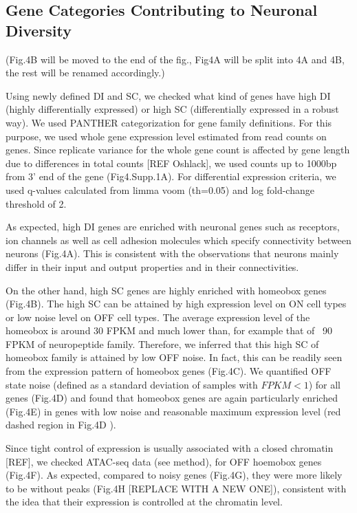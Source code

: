 \subsection{Gene Categories Contributing to Neuronal Diversity}

(Fig.4B will be moved to the end of the fig., Fig4A will be split into 4A and 4B, the rest will be renamed accordingly.)

Using newly defined DI and SC, we checked what kind of genes have high DI (highly differentially expressed) or high SC (differentially expressed in a robust way). We used PANTHER categorization for gene family definitions. For this purpose, we used whole gene expression level estimated from read counts on genes. Since replicate variance for the whole gene count is affected by gene length due to differences in total counts [REF Oshlack], we used counts up to 1000bp from 3' end of the gene (Fig4.Supp.1A). For differential expression criteria, we used q-values calculated from limma voom (th=0.05) and log fold-change threshold of 2.

As expected, high DI genes are enriched with neuronal genes such as receptors, ion channels as well as cell adhesion molecules which specify connectivity between neurons (Fig.4A). This is consistent with the observations that neurons mainly differ in their input and output properties and in their connectivities.

On the other hand, high SC genes are highly enriched with homeobox genes (Fig.4B). The high SC can be attained by high expression level on ON cell types or low noise level on OFF cell types. The average expression level of the homeobox is around 30 FPKM and much lower than, for example that of ~90 FPKM of neuropeptide family. Therefore, we inferred that this high SC of homeobox family is attained by low OFF noise. In fact, this can be readily seen from the expression pattern of homeobox genes (Fig.4C). We quantified OFF state noise (defined as a standard deviation of samples with $FPKM<1$) for all genes (Fig.4D) and found that homeobox genes are again particularly enriched (Fig.4E) in genes with low noise and reasonable maximum expression level (red dashed region in Fig.4D ).

Since tight control of expression is usually associated with a closed chromatin [REF], we checked ATAC-seq data (see method), for OFF hoemobox genes (Fig.4F). As expected, compared to noisy genes (Fig.4G), they were more likely to be without peaks (Fig.4H [REPLACE WITH A NEW ONE]), consistent with the idea that their expression is controlled at the chromatin level.


